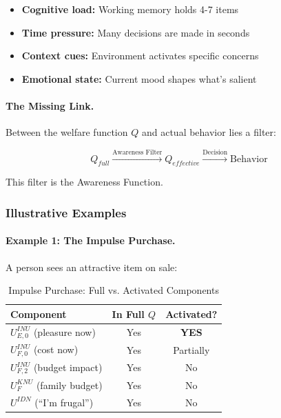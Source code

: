 \begin{itemize}
\item \textbf{Cognitive load:} Working memory holds 4-7 items
\item \textbf{Time pressure:} Many decisions are made in seconds
\item \textbf{Context cues:} Environment activates specific concerns
\item \textbf{Emotional state:} Current mood shapes what's salient
\end{itemize}

\paragraph{The Missing Link.}
Between the welfare function $Q$ and actual behavior lies a filter:

\begin{equation}
Q_{full} \xrightarrow{\text{Awareness Filter}} Q_{effective} \xrightarrow{\text{Decision}} \text{Behavior}
\end{equation}

This filter is the Awareness Function.

\subsubsection{Illustrative Examples}

\paragraph{Example 1: The Impulse Purchase.}
A person sees an attractive item on sale:

\begin{table}[htbp]
\centering
\caption{Impulse Purchase: Full vs. Activated Components}
\label{tab:impulse-purchase}
\renewcommand{\arraystretch}{1.3}
\begin{tabular}{@{}lcc@{}}
\toprule
\textbf{Component} & \textbf{In Full $Q$} & \textbf{Activated?} \\
\midrule
$U^{INU}_{E,0}$ (pleasure now) & Yes & \textbf{YES} \\
$U^{INU}_{F,0}$ (cost now) & Yes & Partially \\
$U^{INU}_{F,2}$ (budget impact) & Yes & No \\
$U^{KNU}_{F}$ (family budget) & Yes & No \\
$U^{IDN}$ (``I'm frugal'') & Yes & No \\
\bottomrule
\end{tabular}
\end{table}

